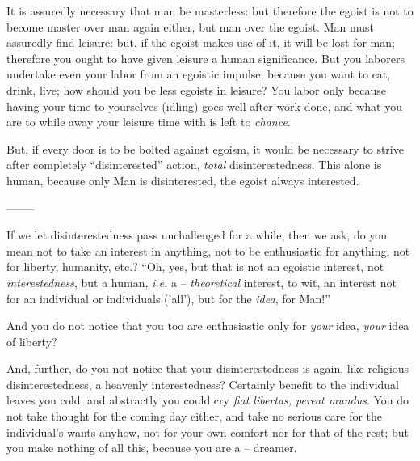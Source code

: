 It is assuredly necessary that man be masterless: but therefore the egoist is 
not to become master over man again either, but man over the egoist. Man must 
assuredly find leisure: but, if the egoist makes use of it, it will be lost 
for man; therefore you ought to have given leisure a human significance. But 
you laborers undertake even your labor from an egoistic impulse, because you 
want to eat, drink, live; how should you be less egoists in leisure? You labor 
only because having your time to yourselves (idling) goes well after work 
done, and what you are to while away your leisure time with is left to 
\textit{chance}.

But, if every door is to be bolted against egoism, it would be necessary to 
strive after completely ``disinterested'' action, \textit{total} 
disinterestedness. This alone is human, because only Man is disinterested, the 
egoist always interested.

\begin{center}
--------\end{center}


If we let disinterestedness pass unchallenged for a while, then we ask, do you 
mean not to take an interest in anything, not to be enthusiastic for anything, 
not for liberty, humanity, etc.? ``Oh, yes, but that is not an egoistic 
interest, not \textit{interestedness}, but a human, \textit{i.e.} a -- 
\textit{theoretical} interest, to wit, an interest not for an individual or 
individuals ('all'), but for the \textit{idea}, for Man!''

And you do not notice that you too are enthusiastic only for \textit{your} 
idea, \textit{your} idea of liberty?

And, further, do you not notice that your disinterestedness is again, like 
religious disinterestedness, a heavenly interestedness? Certainly benefit to 
the individual leaves you cold, and abstractly you could cry \textit{fiat 
libertas, pereat mundus}. You do not take thought for the coming day either, 
and take no serious care for the individual's wants anyhow, not for your own 
comfort nor for that of the rest; but you make nothing of all this, because 
you are a -- dreamer.

